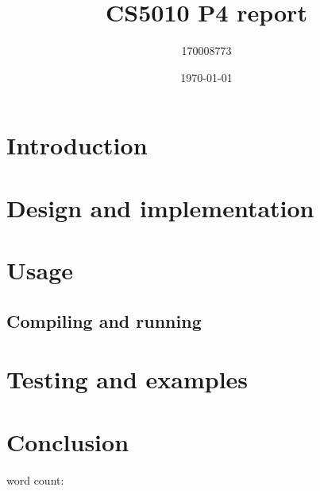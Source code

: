 \documentclass[british]{article}
\title{CS5010 P4 report}
\author{170008773}
\date{\today}
\begin{document}
\maketitle

\section{Introduction}
\label{intro}

\section{Design and implementation}
\label{design}

\section{Usage}
\label{usage}
\subsection{Compiling and running}




\section{Testing and examples}
\label{testing}


\section{Conclusion}
\label{conclusion}

 
 
 
word count: 
\end{document}
